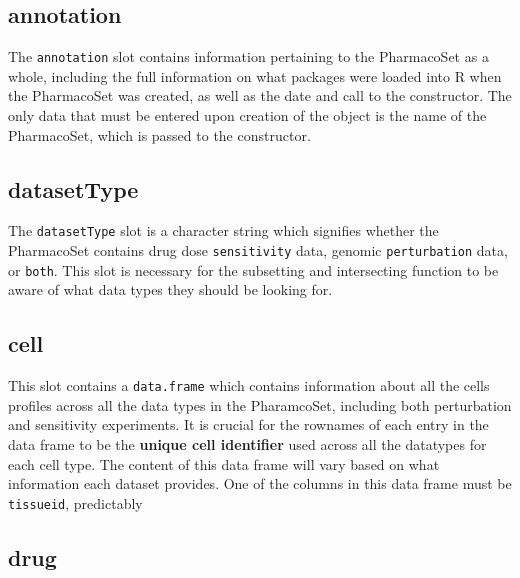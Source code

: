 \documentclass[11pt]{article}
\begin{document}
\subsection{annotation}

The \texttt{annotation} slot contains information pertaining to the PharmacoSet as a whole, including the full information on what packages were loaded into R when the PharmacoSet was created, as well as the date and call to the constructor. The only data that must be entered upon creation of the object is the name of the PharmacoSet, which is passed to the constructor. 

\subsection{datasetType}

The \texttt{datasetType} slot is a character string which signifies whether the PharmacoSet contains drug dose \texttt{sensitivity} data, genomic \texttt{perturbation} data, or \texttt{both}. This slot is necessary for the subsetting and intersecting function to be aware of what data types they should be looking for. 


\subsection{cell}

This slot contains a \texttt{data.frame} which contains information about all the cells profiles across all the data types in the PharamcoSet, including both perturbation and sensitivity experiments. It is crucial for the rownames of each entry in the data frame to be the \textbf{unique cell identifier} used across all the datatypes for each cell type. The content of this data frame will vary based on what information each dataset provides. One of the columns in this data frame must be \texttt{tissueid}, predictably 


\subsection{drug}
\end{document}
